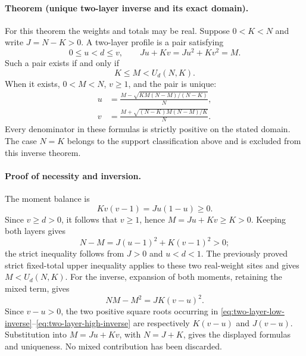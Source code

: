 \paragraph{Theorem (unique two-layer inverse and its exact domain).}
For this theorem the weights and totals may be real.  Suppose \(0<K<N\)
and write \(J=N-K>0\).  A two-layer profile is a pair satisfying
\begin{equation}
 0\le u<d\le v,\qquad Ju+Kv=Ju^2+Kv^2=M.
 \label{eq:two-layer-profile}
\end{equation}
Such a pair exists if and only if
\begin{equation}
 K\le M<U_d(N,K).
 \label{eq:two-layer-domain}
\end{equation}
When it exists, \(0<M<N\), \(v\ge1\), and the pair is unique:
\begin{align}
 u&=\frac{M-\sqrt{KM(N-M)/(N-K)}}{N},
 \label{eq:two-layer-low-inverse}\\
 v&=\frac{M+\sqrt{(N-K)M(N-M)/K}}{N}.
 \label{eq:two-layer-high-inverse}
\end{align}
Every denominator in these formulas is strictly positive on the stated
domain.  The case \(N=K\) belongs to the support classification above
and is excluded from this inverse theorem.

\paragraph{Proof of necessity and inversion.}
The moment balance is
\[
 K v(v-1)=J u(1-u)\ge0.
\]
Since \(v\ge d>0\), it follows that \(v\ge1\), hence
\(M=Ju+Kv\ge K>0\).  Keeping both layers gives
\[
 N-M=J(u-1)^2+K(v-1)^2>0;
\]
the strict inequality follows from \(J>0\) and \(u<d<1\).
The previously proved strict fixed-total upper inequality applies to these
two real-weight sites and gives \(M<U_d(N,K)\).
For the inverse, expansion of both moments, retaining the mixed term, gives
\begin{equation}
 NM-M^2=JK(v-u)^2.
 \label{eq:two-layer-exact-variance}
\end{equation}
Since \(v-u>0\), the two positive square roots occurring in
\eqref{eq:two-layer-low-inverse}--\eqref{eq:two-layer-high-inverse}
are respectively \(K(v-u)\) and \(J(v-u)\).  Substitution into
\(M=Ju+Kv\), with \(N=J+K\), gives the displayed formulas and
uniqueness.  No mixed contribution has been discarded.


